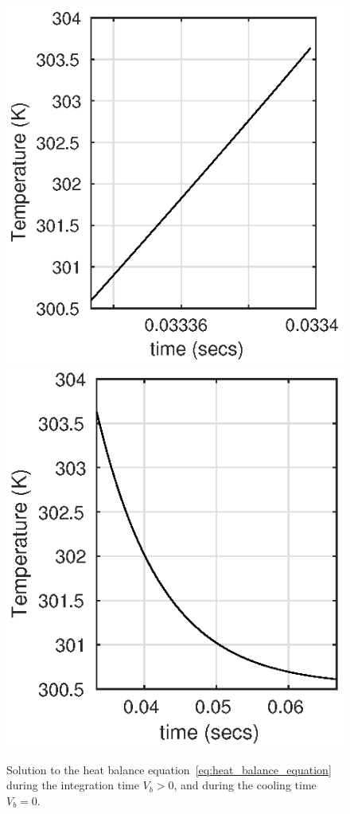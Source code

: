 \begin{figure} 
\includegraphics[scale=0.9]{gfx/fig1_int_time.eps} 
\includegraphics[scale=0.9]{gfx/fig1_cooling.eps}
\caption{Solution to the heat balance equation~\eqref{eq:heat_balance_equation} during the integration time $V_b>0$, and during the cooling time $V_b=0$. }
\label{fig:solution_heat_balance_eq_splitted}
\end{figure}
